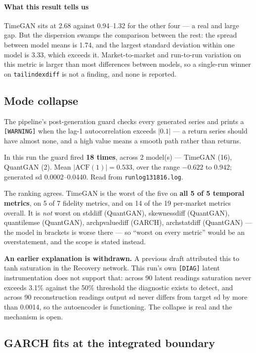 \documentclass[11pt,a4paper]{article}
\makeatletter
\DeclareRobustCommand{\_}{\ifmmode\nfss@text{\textunderscore}\else\textunderscore\allowbreak\fi}
\makeatother
\begin{document}
\paragraph{What this result tells us} TimeGAN sits at 2.68 against 0.94--1.32 for the other four --- a real and large gap. But the dispersion swamps the comparison between the rest: the spread between model means is 1.74, and the largest standard deviation within one model is 3.33, which exceeds it. Market-to-market and run-to-run variation on this metric is larger than most differences between models, so a single-run winner on \texttt{tail\_index\_diff} is not a finding, and none is reported.

\subsection{Mode collapse}
\label{sec:collapse}
The pipeline's post-generation guard checks every generated series and prints a \texttt{[WARNING]} when the lag-1 autocorrelation exceeds $|0.1|$ --- a return series should have almost none, and a high value means a smooth path rather than returns.

In this run the guard fired \textbf{18 times}, across 2 model(s) --- TimeGAN (16), QuantGAN (2). Mean \(|\text{ACF}(1)| = 0.533\), over the range \(-0.622\) to \(0.942\); generated sd 0.0002--0.0440. Read from \texttt{run\_log\_20260912\_131816.log}.

The ranking agrees. TimeGAN is the worst of the five on \textbf{all 5 of 5 temporal metrics}, on 5 of 7 fidelity metrics, and on 14 of the 19 per-market metrics overall. It is \emph{not} worst on std\_diff (QuantGAN), skewness\_diff (QuantGAN), quantile\_mse (QuantGAN), arch\_pvalue\_diff (GARCH), arch\_stat\_diff (QuantGAN) --- the model in brackets is worse there --- so ``worst on every metric'' would be an overstatement, and the scope is stated instead.

\textbf{An earlier explanation is withdrawn.} A previous draft attributed this to tanh saturation in the Recovery network. This run's own \texttt{[DIAG]} latent instrumentation does not support that: across 90 latent readings saturation never exceeds 3.1\% against the 50\% threshold the diagnostic exists to detect, and across 90 reconstruction readings output sd never differs from target sd by more than 0.0014, so the autoencoder is functioning. The collapse is real and the mechanism is open.

\subsection{GARCH fits at the integrated boundary}
\label{sec:boundary}
\end{document}
